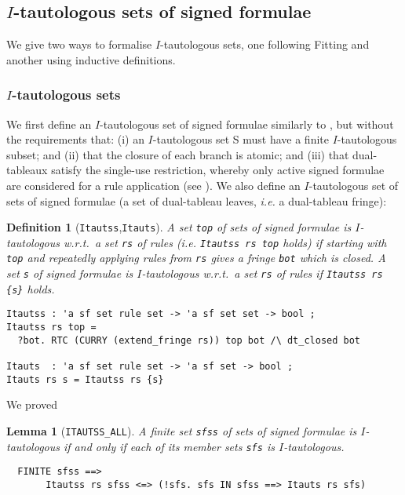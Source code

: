 \documentclass[a4paper]{article}
\newtheorem{lemma}{Lemma}
\newtheorem{definition}{Definition}
\newcommand{\ie}{\textit{i.e. }}
\begin{document}
\subsection{$I$-tautologous sets of signed formulae}

We give two ways to formalise $I$-tautologous sets, one following Fitting
and another using inductive definitions.

\subsubsection{$I$-tautologous sets }

We first define an $I$-tautologous set of signed formulae similarly to
\cite[Definition~4]{fitting-dual-tableau}, but without the
requirements that: (i) an $I$-tautologous set S must have a finite
$I$-tautologous subset; and (ii) that the closure of each branch is
atomic; and (iii) that dual-tableaux satisfy the single-use
restriction, whereby only active signed formulae are considered for a
rule application (see \cite[Definition~1]{fitting-dual-tableau}).
We also define an $I$-tautologous set of sets of signed formulae (a set
of dual-tableau leaves, \ie a dual-tableau fringe):
\begin{definition}[\texttt{Itautss},\texttt{Itauts}]\label{Itauts-def}
\label{Itauts}
\label{Itautss}
A set \texttt{top} of sets of signed formulae is $I$-tautologous w.r.t.\
a set \texttt{rs} of rules (\ie \texttt{Itautss rs top} holds) if
starting with \texttt{top} and repeatedly applying rules from
\texttt{rs} gives
a fringe \texttt{bot} which is closed. A set \texttt{s} of signed
formulae is $I$-tautologous w.r.t.\ a set \texttt{rs} of rules if
\texttt{Itautss rs \{s\}} holds.
\begin{verbatim}
Itautss : 'a sf set rule set -> 'a sf set set -> bool ;
Itautss rs top = 
  ?bot. RTC (CURRY (extend_fringe rs)) top bot /\ dt_closed bot

Itauts  : 'a sf set rule set -> 'a sf set -> bool ;
Itauts rs s = Itautss rs {s} 
\end{verbatim}
\end{definition}

We proved
\begin{lemma}[\texttt{ITAUTSS\_ALL}] \label{ITAUTSS-ALL}
A finite set \texttt{sfss} of sets of signed formulae is $I$-tautologous
if and only if each of its member sets \texttt{sfs} is $I$-tautologous.
\begin{verbatim}
  FINITE sfss ==> 
       Itautss rs sfss <=> (!sfs. sfs IN sfss ==> Itauts rs sfs)
\end{verbatim}
\end{lemma}
\end{document}
